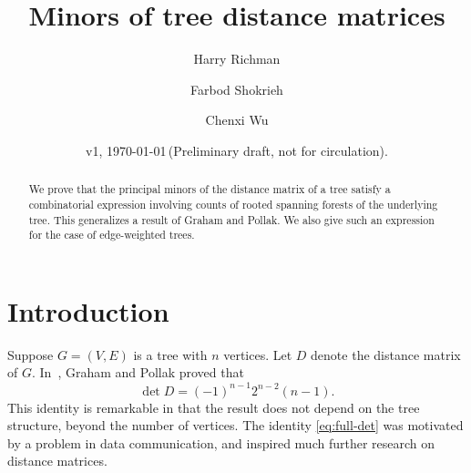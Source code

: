\documentclass{amsart}
\theoremstyle{definition}
\begin{document}
\title{Minors of tree distance matrices}
\author{Harry Richman}
\author{Farbod Shokrieh}
\author{Chenxi Wu}
\date{v1, \today  \,(Preliminary draft, not for circulation).}



\begin{abstract}
We prove that the principal minors of the distance matrix of a tree satisfy a combinatorial expression 
involving counts of rooted spanning forests of the underlying tree.
This generalizes a result of Graham and Pollak.
We also give such an expression for the case of edge-weighted trees.
\end{abstract}
\maketitle

\setcounter{tocdepth}{1}
\tableofcontents

\section{Introduction}

Suppose $G = (V,E)$ is a tree with $n$ vertices.
Let $D$ denote the distance matrix of $G$.
In~\cite{graham-pollak}, Graham and Pollak proved that
\begin{equation}\label{eq:full-det}
\det D = (-1)^{n-1} 2^{n-2} (n-1). 
\end{equation}
This identity is remarkable in that the result does not depend on the tree structure,
beyond the number of vertices.
The identity \eqref{eq:full-det} was motivated by a problem in data communication,
and inspired much further research on distance matrices.
\end{document}
